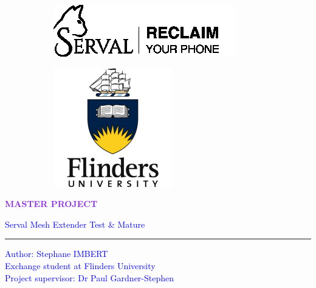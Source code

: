 \begin{titlepage}

		\begin{figure}[t]

			\begin{subfigure}{0.5\textwidth}
			\includegraphics[width=0.9\linewidth, left]{image/serval-logo-2-black.png}
			\end{subfigure}
			\begin{subfigure}{0.5\textwidth}
			\includegraphics[width=0.6\linewidth, right]{image/flinders_university_logo.png}
			\end{subfigure}

		\end{figure}

    \begin{center}
        \vspace*{2cm}
				
        \Huge
        \textbf{\textcolor{BlueViolet}{MASTER PROJECT}}
        
        \vspace{0.5cm}
        \LARGE
				\textcolor{blue}{Serval Mesh Extender Test \& Mature}
				\noindent\color{BlueViolet}\rule{\textwidth}{2pt}
		\end{center}        
		\vspace{1.5cm}
		
		\vfill
		
		\noindent\textcolor{Blue}{
		\large \noindent Author: Stephane IMBERT\\
		Exchange student at Flinders University\\
		Project supervisor: Dr Paul Gardner-Stephen
		}
		

\end{titlepage}
